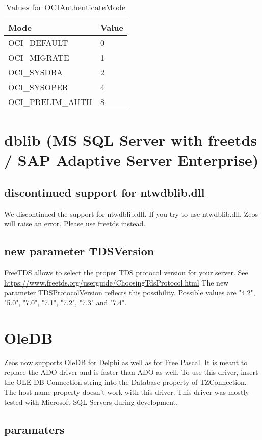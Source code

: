 \documentclass[a4paper,12pt,oneside]{article}
\begin{document}
\begin{table}
    \begin{tabular}{ ll }
	  Mode & Value \\ \hline
    OCI\_DEFAULT & 0 \\
    OCI\_MIGRATE & 1 \\
    OCI\_SYSDBA & 2 \\
    OCI\_SYSOPER & 4 \\
    OCI\_PRELIM\_AUTH & 8 \\
	  \end{tabular}
    \caption{Values for OCIAuthenticateMode}
    \label{tbl:OCIAuthenticateModeValues}
\end{table}

\FloatBarrier
\section{dblib (MS SQL Server with freetds / SAP Adaptive Server Enterprise)}

\subsection{discontinued support for ntwdblib.dll}
We discontinued the support for ntwdblib.dll.
If you try to use ntwdblib.dll, Zeos will raise an error.
Please use freetds instead.

\subsection{new parameter TDSVersion}
FreeTDS allows to select the proper TDS protocol version for your server.
See \url{https://www.freetds.org/userguide/ChoosingTdsProtocol.html}
The new parameter TDSProtocolVersion reflects this possibility.
Possible values are "4.2", "5.0", "7.0", "7.1", "7.2", "7.3" and "7.4".

\section{OleDB}
Zeos now supports OleDB for Delphi as well as for Free Pascal.
It is meant to replace the ADO driver and is faster than ADO as well.
To use this driver, insert the OLE DB Connection string into the Database property of TZConnection.
The host name property doesn't work with this driver.
This driver was mostly tested with Microsoft SQL Servers during development.

\subsection{paramaters}
\end{document}
